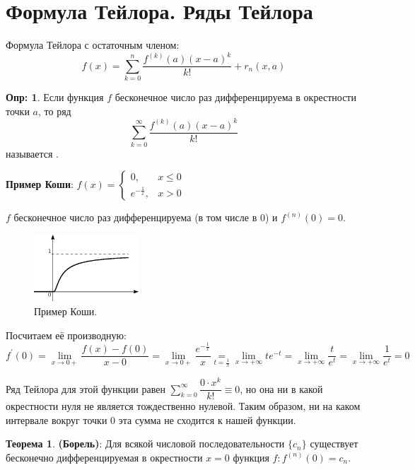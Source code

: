 \documentclass[12pt]{article}
\theoremstyle{definition}
\newtheorem{defn}{Опр:}
\newtheorem{theorem}{Теорема}
\begin{document}

\section*{Формула Тейлора. Ряды Тейлора}

Формула Тейлора с остаточным членом:
$$f(x) = \sum\limits_{k = 0}^{n}\dfrac{f^{(k)}(a)(x-a)^k}{k!} + r_n(x,a)$$

\begin{defn}
	Если функция $f$ бесконечное число раз дифференцируема в окрестности точки $a$, то ряд $$\sum\limits_{k = 0}^{\infty}\dfrac{f^{(k)}(a)(x-a)^k}{k!}$$ 
	называется .
\end{defn}

\textbf{Пример Коши}: $f(x) = \begin{cases} 0, & x\leq 0\\ e^{-\frac{1}{x}}, & x > 0 \end{cases}$

$f$ бесконечное число раз дифференцируема (в том числе в 0) и $f^{(n)}(0) = 0$.
\begin{figure}[H]
	\centering
	\includegraphics[width=0.35\textwidth]{26_1.eps}
	\caption{Пример Коши.}
	\label{26_1}
\end{figure}
Посчитаем её производную: 
$$f^\prime(0) = \lim\limits_{x\to 0+}\dfrac{f(x)- f(0)}{x-0} = \lim\limits_{x \to 0+}\dfrac{e^{-\frac{1}{x}}}{x} \underset{t =\frac{1}{x}}{=} \lim\limits_{x \to +\infty}te^{-t} = \lim\limits_{x \to +\infty}\frac{t}{e^{t}} = \lim\limits_{x \to +\infty}\frac{1}{e^{t}} = 0$$

Ряд Тейлора для этой функции равен $\displaystyle \sum\limits_{k = 0}^{\infty}\dfrac{0{\cdot}x^k}{k!}\equiv 0$, но она ни в какой окрестности нуля не является тождественно нулевой. Таким образом, ни на каком интервале вокруг точки $0$ эта сумма не сходится к нашей функции.

\begin{theorem}\textbf{(Борель)}:
	Для всякой числовой последовательности $\{c_n\}$ существует бесконечно дифференцируемая в окрестности $x=0$ функция $f\colon f^{(n)}(0) = c_n$.
\end{theorem}
\end{document}
